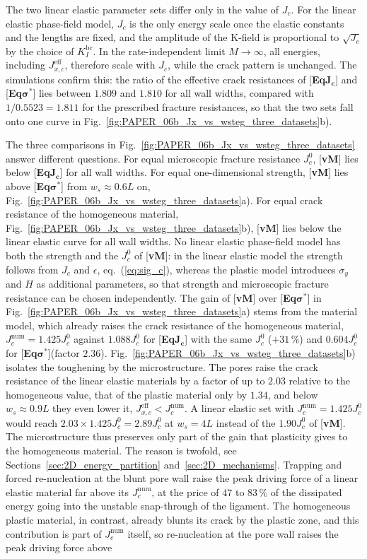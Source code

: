 \documentclass[pdflatex,sn-mathphys-num]{sn-jnl}%
\newcommand{\vMLabel}{[\textbf{vM}]\xspace}
\newcommand{\EqJcLabel}{[\textbf{Eq$\boldsymbol{J_c}$}]\xspace}
\newcommand{\EqSigmaStarLabel}{[\textbf{Eq$\boldsymbol{\sigma^*}$}]\xspace}
\theoremstyle{thmstyleone}%
\theoremstyle{thmstyletwo}%
\theoremstyle{thmstylethree}%
\begin{document}
The two linear elastic parameter sets differ only in the value of $J_c$. For the linear elastic phase-field model, $J_c$ is the only energy scale once the elastic constants and the lengths are fixed, and the amplitude of the K-field is proportional to $\sqrt{J_c}$ by the choice of $K_I^{\text{bc}}$. In the rate-independent limit $M \to \infty$, all energies, including $J_{x,c}^{\text{eff}}$, therefore scale with $J_c$, while the crack pattern is unchanged. The simulations confirm this: the ratio of the effective crack resistances of \EqJcLabel and \EqSigmaStarLabel lies between $1.809$ and $1.810$ for all wall widths, compared with $1/0.5523 = 1.811$ for the prescribed fracture resistances, so that the two sets fall onto one curve in Fig.~\ref{fig:PAPER_06b_Jx_vs_wsteg_three_datasets}b).

The three comparisons in Fig.~\ref{fig:PAPER_06b_Jx_vs_wsteg_three_datasets} answer different questions. For equal microscopic fracture resistance $J_c^0$, \vMLabel lies below \EqJcLabel for all wall widths. For equal one-dimensional strength, \vMLabel lies above \EqSigmaStarLabel from $w_s \approx 0.6L$ on, Fig.~\ref{fig:PAPER_06b_Jx_vs_wsteg_three_datasets}a). For equal crack resistance of the homogeneous material, Fig.~\ref{fig:PAPER_06b_Jx_vs_wsteg_three_datasets}b), \vMLabel lies below the linear elastic curve for all wall widths. No linear elastic phase-field model has both the strength and the $J_c^0$ of \vMLabel: in the linear elastic model the strength follows from $J_c$ and $\epsilon$, eq.~(\ref{eq:sig_c}), whereas the plastic model introduces $\sigma_y$ and $H$ as additional parameters, so that strength and microscopic fracture resistance can be chosen independently. The gain of \vMLabel over \EqSigmaStarLabel in Fig.~\ref{fig:PAPER_06b_Jx_vs_wsteg_three_datasets}a) stems from the material model, which already raises the crack resistance of the homogeneous material, $J_c^{\text{num}} = 1.425J_c^0$ against $1.088J_c^0$ for \EqJcLabel with the same $J_c^0$ ($+31\,\%$) and $0.604J_c^0$ for \EqSigmaStarLabel (factor $2.36$). Fig.~\ref{fig:PAPER_06b_Jx_vs_wsteg_three_datasets}b) isolates the toughening by the microstructure. The pores raise the crack resistance of the linear elastic materials by a factor of up to $2.03$ relative to the homogeneous value, that of the plastic material only by $1.34$, and below $w_s \approx 0.9L$ they even lower it, $J_{x,c}^{\text{eff}} < J_c^{\text{num}}$. A linear elastic set with $J_c^{\text{num}} = 1.425J_c^0$ would reach $2.03 \times 1.425J_c^0 = 2.89J_c^0$ at $w_s = 4L$ instead of the $1.90J_c^0$ of \vMLabel. The microstructure thus preserves only part of the gain that plasticity gives to the homogeneous material. The reason is twofold, see Sections~\ref{sec:2D_energy_partition} and~\ref{sec:2D_mechanisms}. Trapping and forced re-nucleation at the blunt pore wall raise the peak driving force of a linear elastic material far above its $J_c^{\text{num}}$, at the price of $47$ to $83\,\%$ of the dissipated energy going into the unstable snap-through of the ligament. The homogeneous plastic material, in contrast, already blunts its crack by the plastic zone, and this contribution is part of $J_c^{\text{num}}$ itself, so re-nucleation at the pore wall raises the peak driving force above 
\end{document}
